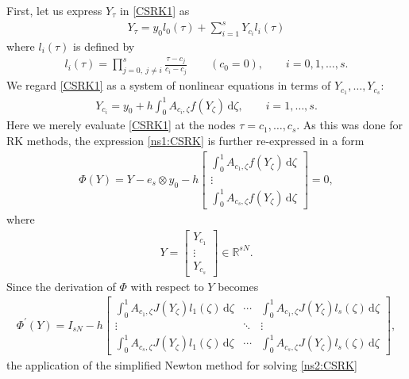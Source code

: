 \documentclass[final,leqno,onefignum,onetabnum]{siamltex1213}
\begin{document}
First, let us express $Y_\tau$ in \eqref{CSRK1} as
\begin{align}
Y_\tau = y_0 l_0 (\tau) + \sum_{i=1}^s Y_{c_i} l_i(\tau)
\end{align}
where $l_i(\tau)$ is defined by
\begin{align}\label{defl}
l_i (\tau) = \prod_{j=0,\ j\neq i}^s \frac{\tau-c_j}{c_i-c_j}
\qquad
(c_0=0),
\qquad
i=0,1,\dots,s.
\end{align}
We regard \eqref{CSRK1} as
a system of nonlinear equations
in terms of $Y_{c_1},\dots,Y_{c_s}$:	
\begin{align} \label{ns1:CSRK}
Y_{c_i}= y_0 + h\int_0^1 A_{c_i,\zeta} f(Y_\zeta)\,{\mathrm d}\zeta, \qquad i=1,\dots,s.
\end{align}
Here we merely evaluate \eqref{CSRK1} at the nodes $\tau=c_1,\dots,c_s$.
As this was done for RK methods, the expression \eqref{ns1:CSRK}
is further re-expressed in a form
\begin{align}\label{ns2:CSRK}
\Phi (Y) = Y-e_s\otimes y_0 - h
\begin{bmatrix}
\displaystyle{\int_0^1 A_{c_1,\zeta} f(Y_\zeta)\,{\mathrm d} \zeta} \\
\vdots \\
\displaystyle{\int_0^1 A_{c_s,\zeta} f(Y_\zeta)\,{\mathrm d} \zeta}
\end{bmatrix}
=0,
\end{align}
where
\begin{align}
Y = 
\begin{bmatrix}
Y_{c_1} \\ \vdots \\ Y_{c_s}
\end{bmatrix}
\in\mathbb{R}^{sN}.
\end{align}
Since the derivation of $\Phi$ with respect to $Y$ becomes
\begin{align}
\Phi^\prime (Y)
=
I_{sN} - h
\begin{bmatrix}
\displaystyle{\int_0^1 A_{c_1,\zeta} J(Y_\zeta) l_1 (\zeta)\,{\mathrm d}\zeta}
& \cdots &
\displaystyle{\int_0^1 A_{c_1,\zeta} J(Y_\zeta) l_s (\zeta)\,{\mathrm d}\zeta}
\\
\vdots & \ddots & \vdots
\\
\displaystyle{\int_0^1 A_{c_s,\zeta} J(Y_\zeta) l_1 (\zeta)\,{\mathrm d}\zeta}
& \cdots &
\displaystyle{\int_0^1 A_{c_s,\zeta} J(Y_\zeta) l_s (\zeta)\,{\mathrm d}\zeta}
\end{bmatrix},
\end{align}
the application of the simplified Newton method for solving \eqref{ns2:CSRK}
\end{document}
